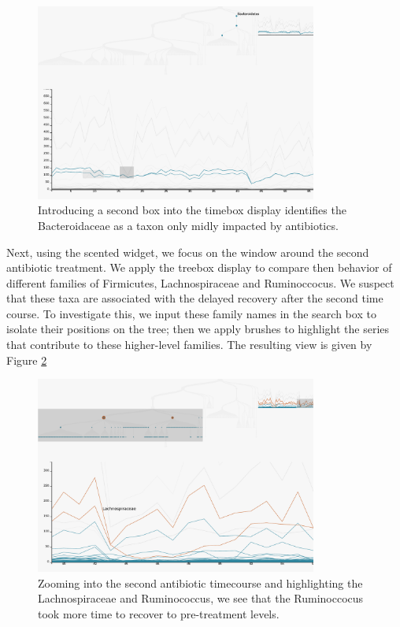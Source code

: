 \documentclass[12pt]{article}
\begin{document}
\begin{figure}

{\centering \includegraphics[width=350px]{figure/antibiotic_bacteroidetes}

}

\caption{Introducing a second box into the timebox display identifies the
  Bacteroidaceae as a taxon only midly impacted by
  antibiotics.}\label{fig:antibioticbacteroidetes}
\end{figure}

Next, using the scented widget, we focus on the window around the second
antibiotic treatment. We apply the treebox display to compare then behavior of
different families of Firmicutes, Lachnospiraceae and Ruminoccocus. We suspect
that these taxa are associated with the delayed recovery after the second time
course. To investigate this, we input these family names in the search box to
isolate their positions on the tree; then we apply brushes to highlight the
series that contribute to these higher-level families. The resulting view is
given by Figure \ref{fig:antibioticfirmicutes}

\begin{figure}
{\centering \includegraphics[width=350px]{figure/antibiotic_firmicutes}

}

\caption{Zooming into the second antibiotic timecourse and highlighting the
  Lachnospiraceae and Ruminococcus, we see that the Ruminoccocus took more time
  to recover to pre-treatment levels.}\label{fig:antibioticfirmicutes}
\end{figure}
\end{document}
